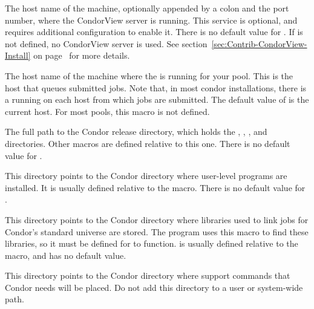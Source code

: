 \begin{description}
\label{param:CondorViewHost}
\item[\Macro{CONDOR\_VIEW\_HOST}]
  The host name of the machine, optionally appended by a colon and the
  port number, where the CondorView server is running.
  This service is optional, and requires additional configuration 
  to enable it.  There is no default value for
  .  If  is not
  defined, no CondorView server is used.
  See section~\ref{sec:Contrib-CondorView-Install} on
  page~\pageref{sec:Contrib-CondorView-Install} for more details.

\label{param:ScheddHost}
\item[\Macro{SCHEDD\_HOST}]
  The host name of the machine where the  is running for
  your pool.  This is the host that queues submitted jobs.  Note that,
  in most condor installations, there is a  running on
  each host from which jobs are submitted.  The default value of
   is the current host.  For most pools, this
  macro is not defined.

\label{param:ReleaseDir}
\item[\Macro{RELEASE\_DIR}]
  The full path to
  the Condor release directory, which holds the ,
  , , and  directories.  Other macros
  are defined relative to this one.  There is no default value for
  .

\label{param:Bin}
\item[\Macro{BIN}]
  This directory points to the
  Condor directory where user-level programs are installed.  It is
  usually defined relative to the  macro.
  There is no default value for .
  
\label{param:Lib}
\item[\Macro{LIB}]
  This directory points to the
  Condor directory where libraries used to link jobs for Condor's
  standard universe are stored.  The  program uses
  this macro to find these libraries, so it must be defined for
   to function.   is usually defined
  relative to the  macro, and has no default
  value.

\label{param:LibExec}
\item[\Macro{LIBEXEC}]
  This directory points
  to the Condor directory where support commands that Condor
  needs will be placed.
  Do not add this directory to a user or system-wide path.


\end{description}
